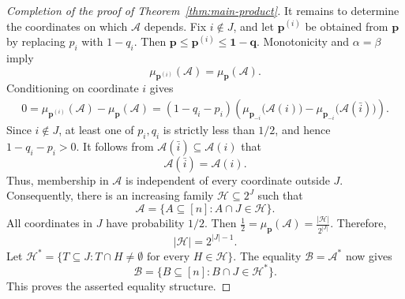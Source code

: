\documentclass[11pt]{article}
\numberwithin{equation}{section}
\theoremstyle{definition}
\theoremstyle{remark}
\begin{document}
\begin{proof}[Completion of the proof of Theorem~\ref{thm:main-product}]
It remains to determine the coordinates on which $\mathcal{A}$ depends.
Fix $i\notin J$, and let $\mathbf p^{(i)}$ be obtained from
$\mathbf p$ by replacing $p_i$ with $1-q_i$.  Then
$
 \mathbf p\leq\mathbf p^{(i)}
 \leq\mathbf 1-\mathbf q.
$
Monotonicity and $\alpha=\beta$ imply
\begin{equation*}
 \mu_{\mathbf p^{(i)}}(\mathcal{A})
 =
 \mu_{\mathbf p}(\mathcal{A}).
\end{equation*}
Conditioning on coordinate $i$ gives
\begin{align*}
 0
 =
 \mu_{\mathbf p^{(i)}}(\mathcal{A})
 -
 \mu_{\mathbf p}(\mathcal{A})=
 (1-q_i-p_i)
 \left(
 \mu_{\mathbf p_{-i}}\bigl(\mathcal{A}(i)\bigr)
 -
 \mu_{\mathbf p_{-i}}\bigl(\mathcal{A}(\bar i)\bigr)
 \right).
\end{align*}
Since $i\notin J$, at least one of $p_i,q_i$ is strictly less than
$1/2$, and hence
$
 1-q_i-p_i>0.
$
It follows from 
$\mathcal{A}(\bar i)\subseteq\mathcal{A}(i)$ that
\begin{equation*}
 \mathcal{A}(\bar i)=\mathcal{A}(i).
\end{equation*}
Thus, membership in $\mathcal{A}$ is independent of every coordinate
outside $J$.  Consequently, there is an increasing family
$\mathcal{H}\subseteq2^J$ such that
\begin{equation*}
 \mathcal{A}
 =
 \{A\subseteq[n]:A\cap J\in\mathcal{H}\}.
\end{equation*}
All coordinates in $J$ have probability $1/2$. Then
$
 \frac12
 =
 \mu_{\mathbf p}(\mathcal{A})
 =
 \frac{|\mathcal{H}|}{2^{|J|}}.
$
Therefore,
\begin{equation*}
 |\mathcal{H}|=2^{|J|-1}.
\end{equation*}
Let
$
 \mathcal{H}^*
 =
 \{T\subseteq J:T\cap H\neq\emptyset
   \text{ for every }H\in\mathcal{H}\}.
$
The equality $\mathcal{B}=\mathcal{A}^*$ now gives
\begin{equation*}
 \mathcal{B}
 =
 \{B\subseteq[n]:B\cap J\in\mathcal{H}^*\}.
\end{equation*}
This proves the asserted equality structure.


\end{proof}
\end{document}
